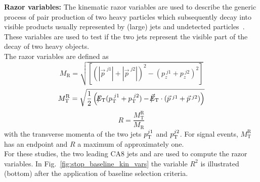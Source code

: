 \begin{description}
 \item \textbf{Razor variables:} The kinematic razor variables are used to describe the generic process of pair production of two heavy particles which subsequently decay into visible products usually represented by (large) jets and undetected particles~\cite{Chatrchyan:2012uea, Chatrchyan:2014goa, CMS-PAS-SUS-14-011}. These variables are used to test if the two jets represent the visible part of the decay of two heavy objects. \\
The razor variables are defined as
\begin{equation}
M_\mathrm{R} = \sqrt{\left[(|\vec{p}^{\; j1} | + |\vec{p}^{\; j2} |)^2 - (p_z^{\; j1}  + p_z^{\; j2} )^2 \right]}
\end{equation}
 \begin{equation}
M_\mathrm{T}^\mathrm{R} = \sqrt{\frac{1}{2} \left( \slash\mkern-12mu{E}_{\text{T}} (p_{\text{T}}^{\; j1}  + p_{\text{T}}^{\; j2} ) - \slash\mkern-12mu{\vec{E}}_{\text{T}} \cdot (\vec{p}^{\; j1} + \vec{p}^{\; j2}) \right) }
\end{equation}
\begin{equation}
R = \frac{M_\mathrm{T}^\mathrm{R}}{M_\mathrm{R}}
\end{equation}
with the transverse momenta of the two jets $p_{\text{T}}^{j1}$ and $p_{\text{T}}^{j2}$. For signal events, $M_\mathrm{T}^\mathrm{R}$ has an endpoint and $R$ a maximum of approximately one. \\
For these studies, the two leading CA8 jets and \met are used to compute the razor variables. In Fig.~\ref{fig:stop_baseline_kin_vars} the variable $R^2$ is illustrated (bottom) after the application of baseline selection criteria. 
\end{description} 

